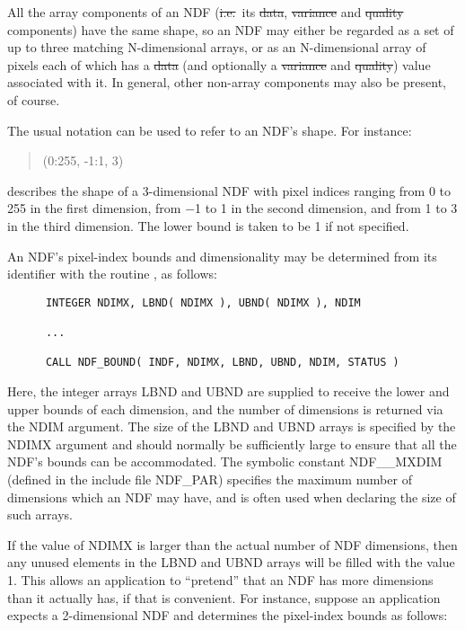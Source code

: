 All the array components of an NDF (\st{i.e.}\ its \st{data}, \st{variance\/} and
\st{quality\/} components) have the same shape, so an NDF may either be
regarded as a set of up to three matching N-dimensional arrays, or as an
N-dimensional array of pixels each of which has a \st{data\/} (and optionally
a \st{variance\/} and \st{quality\/}) value associated with it. In general,
other non-array components may also be present, of course.

The usual notation can be used to refer to an NDF's shape.
For instance: 

\small
\begin{quote}
\begin{center}
(0:255, -1:1, 3)
\end{center}
\end{quote}
\normalsize

describes the shape of a 3-dimensional NDF with pixel indices ranging from 0
to 255 in the first dimension, from $-$1 to 1 in the second dimension, and
from 1 to 3 in the third dimension. 
The lower bound is taken to be 1 if not specified.

An NDF's pixel-index bounds and dimensionality may be determined from its 
identifier with the routine , as follows:

\small
\begin{verbatim}
      INTEGER NDIMX, LBND( NDIMX ), UBND( NDIMX ), NDIM

      ...

      CALL NDF_BOUND( INDF, NDIMX, LBND, UBND, NDIM, STATUS )
\end{verbatim}
\normalsize

Here, the integer arrays LBND and UBND are supplied to receive the lower and
upper bounds of each dimension, and the number of dimensions is returned via the
NDIM argument. 
The size of the LBND and UBND arrays is specified by the NDIMX argument and
should normally be sufficiently large to ensure that all the NDF's bounds can be
accommodated.
The symbolic constant NDF\_\_MXDIM (defined in the include file NDF\_PAR)
specifies the maximum number of dimensions which an NDF may have, and is
often used when declaring the size of such arrays. 

If the value of NDIMX is larger than the actual number of NDF dimensions,
then any unused elements in the LBND and UBND arrays will be filled with the
value 1. 
This allows an application to ``pretend'' that an NDF has more dimensions than
it actually has, if that is convenient. 
For instance, suppose an application expects a 2-dimensional NDF and determines 
the pixel-index bounds as follows:

